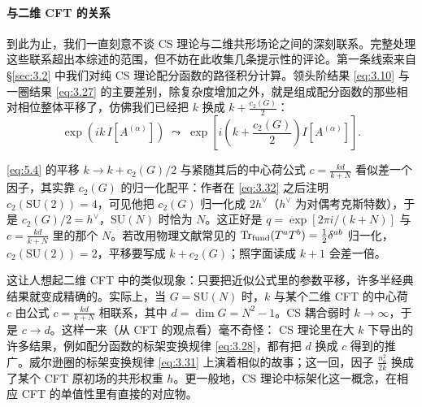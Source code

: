 \paragraph{与二维 CFT 的关系}
到此为止，我们一直刻意不谈 CS 理论与二维共形场论之间的深刻联系。完整处理这些联系超出本综述的范围，但不妨在此收集几条提示性的评论。第一条线索来自 \S\ref{sec:3.2} 中我们对纯 CS 理论配分函数的路径积分计算。领头阶结果 \eqref{eq:3.10} 与一圈结果 \eqref{eq:3.27} 的主要差别，除复杂度增加之外，就是组成配分函数的那些相对相位整体平移了，仿佛我们已经把 $k$ 换成 $k+\frac{c_2(G)}{2}$：
\begin{equation}\tag{5.4}\label{eq:5.4}
  \exp\left(ik\,I[A^{(\alpha)}]\right)
  \;\leadsto\;
  \exp\left[i\left(k+\frac{c_2(G)}{2}\right)I[A^{(\alpha)}]\right] .
\end{equation}

\begin{yizhu}[易错点]
\eqref{eq:5.4} 的平移 $k\to k+c_2(G)/2$ 与紧随其后的中心荷公式 $c=\frac{kd}{k+N}$ 看似差一个因子，其实靠 $c_2(G)$ 的归一化配平：作者在 \eqref{eq:3.32} 之后注明 $c_2(\mathrm{SU}(2))=4$，可见他把 $c_2(G)$ 归一化成 $2h^\vee$（$h^\vee$ 为对偶考克斯特数），于是 $c_2(G)/2=h^\vee$，$\mathrm{SU}(N)$ 时恰为 $N$。这正好是 $q=\exp[2\pi i/(k+N)]$ 与 $c=\frac{kd}{k+N}$ 里的那个 $N$。若改用物理文献常见的 $\operatorname{Tr}_{\rm fund}(T^aT^b)=\frac12\delta^{ab}$ 归一化，$c_2(\mathrm{SU}(2))=2$，平移要写成 $k+c_2(G)$；照字面读成 $k+1$ 会差一倍。
\end{yizhu}

这让人想起二维 CFT 中的类似现象：只要把近似公式里的参数平移，许多半经典结果就变成精确的。实际上，当 $G=\mathrm{SU}(N)$ 时，$k$ 与某个二维 CFT 的中心荷 $c$ 由公式 $c=\frac{kd}{k+N}$ 相联系，其中 $d=\dim G=N^2-1$。CS 耦合弱时 $k\to\infty$，于是 $c\to d$。这样一来（从 CFT 的观点看）毫不奇怪：
CS 理论里在大 $k$ 下导出的许多结果，例如配分函数的标架变换规律 \eqref{eq:3.28}，都有把 $d$ 换成 $c$ 得到的推广。威尔逊圈的标架变换规律 \eqref{eq:3.31} 上演着相似的故事；这一回，因子 $\frac{n_a^2}{2k}$ 换成了某个 CFT 原初场的共形权重 $h$。更一般地，CS 理论中标架化这一概念，在相应 CFT 的单值性里有直接的对应物。

